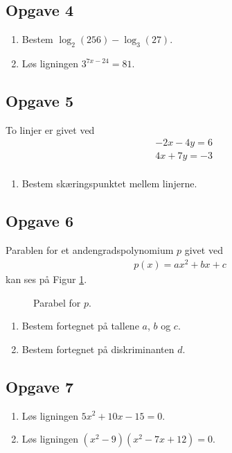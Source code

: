\subsection*{Opgave 4}
\begin{enumerate}[label=\roman*)]
	\item Bestem $\log_2(256) - \log_3(27).$
	\item Løs ligningen $3^{7x-24} = 81.$
\end{enumerate}

\subsection*{Opgave 5}
To linjer er givet ved
\begin{align*}
	&-2x - 4y = 6\\
	&4x + 7y = -3\\
\end{align*}
\begin{enumerate}[label=\roman*)]
	\item Bestem skæringspunktet mellem linjerne. 
\end{enumerate}

\subsection*{Opgave 6}
Parablen for et andengradspolynomium $p$ givet ved
\begin{align*}
	p(x) = ax^2 + bx + c
\end{align*}
kan ses på Figur \ref{fig:parabel}.
\begin{figure}[h]
	\centering
	\caption{Parabel for $p$.}
	\label{fig:parabel}
\end{figure}
\begin{enumerate}[label=\roman*)]
	\item Bestem fortegnet på tallene $a$, $b$ og $c$. 
	\item Bestem fortegnet på diskriminanten $d$. 
\end{enumerate}

\subsection*{Opgave 7}
\begin{enumerate}[label=\roman*)]
	\item Løs ligningen $5x^2 + 10x - 15 = 0$. 
	\item Løs ligningen $(x^2-9)(x^2 - 7x +12) = 0$.
\end{enumerate}

